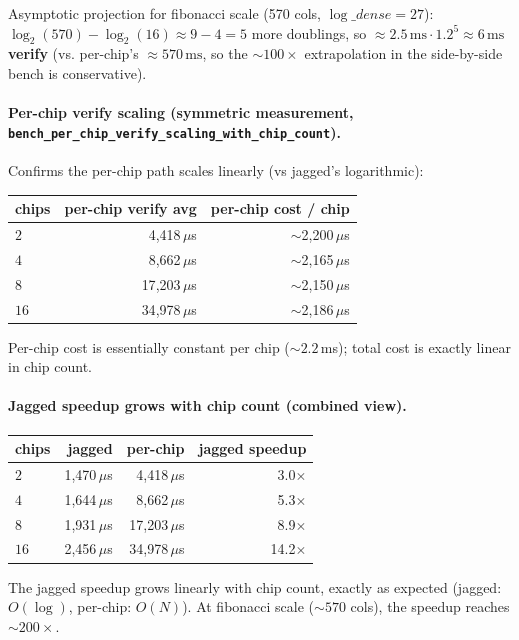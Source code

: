 Asymptotic projection for fibonacci scale (570 cols, $\log\_dense = 27$):
$\log_2(570) - \log_2(16) \approx 9-4 = 5$ more doublings, so
\textbf{$\approx 2.5\,\mathrm{ms} \cdot 1.2^5 \approx 6\,\mathrm{ms}$
verify} (vs. per-chip's $\approx 570\,\mathrm{ms}$, so the $\sim 100\times$
extrapolation in the side-by-side bench is conservative).

\paragraph{Per-chip verify scaling (symmetric measurement,
\texttt{bench\_per\_chip\_verify\_scaling\_with\_chip\_count}).}
Confirms the per-chip path scales linearly (vs jagged's logarithmic):

\begin{tabular}{lrr}
\toprule
\textbf{chips} & \textbf{per-chip verify avg} & \textbf{per-chip cost / chip} \\
\midrule
$2$  &  4{,}418\,$\mu$s & $\sim$2{,}200\,$\mu$s \\
$4$  &  8{,}662\,$\mu$s & $\sim$2{,}165\,$\mu$s \\
$8$  & 17{,}203\,$\mu$s & $\sim$2{,}150\,$\mu$s \\
$16$ & 34{,}978\,$\mu$s & $\sim$2{,}186\,$\mu$s \\
\bottomrule
\end{tabular}

Per-chip cost is essentially constant per chip ($\sim 2.2$\,ms);
total cost is exactly linear in chip count.

\paragraph{Jagged speedup grows with chip count (combined view).}

\begin{tabular}{lrrr}
\toprule
\textbf{chips} & \textbf{jagged} & \textbf{per-chip} & \textbf{jagged speedup} \\
\midrule
$2$  & 1{,}470\,$\mu$s &  4{,}418\,$\mu$s &  3.0$\times$ \\
$4$  & 1{,}644\,$\mu$s &  8{,}662\,$\mu$s &  5.3$\times$ \\
$8$  & 1{,}931\,$\mu$s & 17{,}203\,$\mu$s &  8.9$\times$ \\
$16$ & 2{,}456\,$\mu$s & 34{,}978\,$\mu$s & 14.2$\times$ \\
\bottomrule
\end{tabular}

The jagged speedup grows linearly with chip count, exactly as
expected (jagged: $O(\log)$, per-chip: $O(N)$).  At fibonacci scale
($\sim 570$ cols), the speedup reaches $\sim 200\times$.

